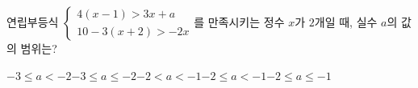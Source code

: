 연립부등식 $\begin{cases} 4(x-1)>3x+a \\ 10-3(x+2)>-2x \end{cases}$를 만족시키는 정수 $x$가 $2$개일 때, 실수 $a$의 값의 범위는?
\begin{choicesii}{$-3\le a<-2$}{$-3\le a\le -2$}{$-2<a<-1$}{$-2\le a<-1$}{$-2\le a\le -1$}\end{choicesii}
